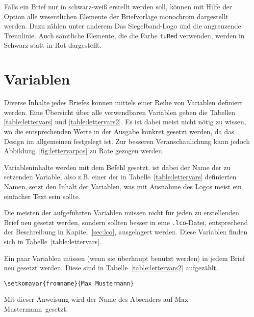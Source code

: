 Falls ein Brief nur in schwarz-weiß erstellt werden soll, können mit Hilfe
der Option  alle wesentlichen Elemente der Briefvorlage monochrom
dargestellt werden. Dazu zählen unter anderem Das Siegelband-Logo und die
angrenzende Trennlinie.
Auch sämtliche Elemente, die die Farbe \texttt{tuRed} verwenden, werden
in Schwarz statt in Rot dargestellt.

\section{Variablen}\label{sec:lettervars}

Diverse Inhalte jedes Briefes können mittels einer Reihe von Variablen
definiert werden.
Eine Übersicht über alle verwendbaren Variablen geben die
Tabellen \ref{table:lettervars} und \ref{table:lettervars2}.
Es ist dabei meist nicht nötig zu wissen,
wo die entsprechenden Werte in der Ausgabe konkret gesetzt werden,
da das Design im allgemeinen festgelegt ist.
Zur besseren Veranschaulichung kann jedoch
Abbildung~\ref{fig:lettervarpos} zu Rate gezogen werden.

\begin{Declaration}
\end{Declaration}

Variableninhalte werden mit dem Befehl  gesetzt.
 ist dabei der Name der zu setzenden Variable, also z.B. einer der in
Tabelle~\ref{table:lettervars} definierten Namen.  setzt den
Inhalt der Variablen, was mit Ausnahme des Logos meist ein einfacher
Text sein sollte.

Die meisten der aufgeführten Variablen müssen nicht für jeden zu erstellenden
Brief neu gesetzt werden, sondern sollten besser in eine \texttt{.lco}-Datei,
entsprechend der Beschreibung in Kapitel~\ref{sec:lco}, ausgelagert werden.
Diese Variablen finden sich in Tabelle~\ref{table:lettervars}.

Ein paar Variablen müssen (wenn sie überhaupt benutzt werden) in jedem Brief
neu gesetzt werden. Diese sind in Tabelle~\ref{table:lettervars2} aufgezählt.

\begin{example}
\begin{lstlisting}
\setkomavar{fromname}{Max Mustermann}
\end{lstlisting}
Mit dieser Anweisung wird der Name des Absenders auf \glqq Max Mustermann\grqq\ 
gesetzt.
\end{example}



